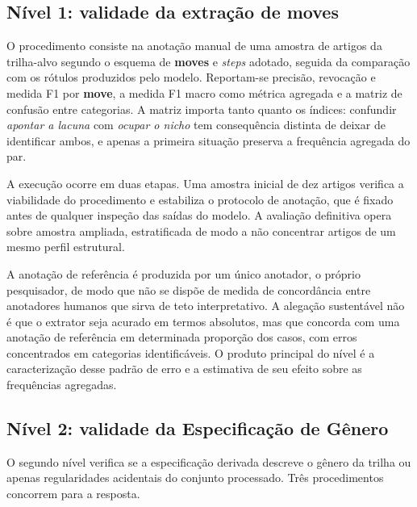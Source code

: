 \subsection{Nível 1: validade da extração de \textbf{moves}}
\label{sec:nivel1}


O procedimento consiste na anotação manual de uma amostra de artigos da trilha-alvo segundo o esquema de \textbf{moves} e \textit{steps} adotado, seguida da comparação com os rótulos produzidos pelo modelo. Reportam-se precisão, revocação e medida F1 por \textbf{move}, a medida F1 macro como métrica agregada e a matriz de confusão entre categorias. A matriz importa tanto quanto os índices: confundir \textit{apontar a lacuna} com \textit{ocupar o nicho} tem consequência distinta de deixar de identificar ambos, e apenas a primeira situação preserva a frequência agregada do par.

A execução ocorre em duas etapas. Uma amostra inicial de dez artigos verifica a viabilidade do procedimento e estabiliza o protocolo de anotação, que é fixado antes de qualquer inspeção das saídas do modelo. A avaliação definitiva opera sobre amostra ampliada, estratificada de modo a não concentrar artigos de um mesmo perfil estrutural.

A anotação de referência é produzida por um único anotador, o próprio pesquisador, de modo que não se dispõe de medida de concordância entre anotadores humanos que sirva de teto interpretativo. A alegação sustentável não é que o extrator seja acurado em termos absolutos, mas que concorda com uma anotação de referência em determinada proporção dos casos, com erros concentrados em categorias identificáveis. O produto principal do nível é a caracterização desse padrão de erro e a estimativa de seu efeito sobre as frequências agregadas.

\subsection{Nível 2: validade da Especificação de Gênero}
\label{sec:nivel2}

O segundo nível verifica se a especificação derivada descreve o gênero da trilha ou apenas regularidades acidentais do conjunto processado. Três procedimentos concorrem para a resposta.


